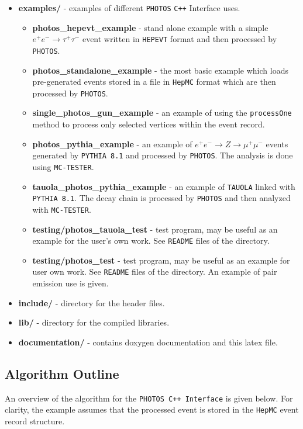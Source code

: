 \documentclass[]{Photos_interface_design}
\begin{document}
\begin{itemize}
  \item {\bf examples/ } - examples of different {\tt PHOTOS} {\tt C++} Interface uses.
    \begin{itemize}
        \item {\bf photos\_hepevt\_example} - stand alone example with a simple 
        $e^+e^- \rightarrow \tau^+\tau^-$ event written in {\tt HEPEVT} format
         and then processed by {\tt PHOTOS}.
	\item {\bf photos\_standalone\_example} - the most basic example which loads pre-generated 
	      events stored in a file in {\tt HepMC} format which are then processed by {\tt PHOTOS}.
	\item {\bf single\_photos\_gun\_example} - an example of using the {\tt processOne} method
	      to process only selected vertices within the event record.
    \item {\bf photos\_pythia\_example} - an example of $e^+e^- \rightarrow Z \rightarrow \mu^+\mu^-$ events
	generated by {\tt PYTHIA 8.1} and processed by {\tt PHOTOS}. The analysis is done using {\tt MC-TESTER}.
    \item {\bf tauola\_photos\_pythia\_example } - an example of  {\tt TAUOLA} linked with {\tt PYTHIA 8.1}.
	The decay chain is processed by {\tt PHOTOS} and then analyzed with {\tt MC-TESTER}.
\item {\bf testing/photos\_tauola\_test} - test program, may be useful as an example for the user's own work. See {\tt README} files of the directory. 
\item {\bf testing/photos\_test} - test program, may be useful as an example for user own work. See {\tt README} files of the directory. An example of pair emission use is given.
    \end{itemize}   
  \item {\bf include/} - directory for the header files.
  \item {\bf lib/ } - directory for the compiled  libraries. 
  \item {\bf documentation/ } - contains doxygen documentation and this latex file.
\end{itemize}

\subsection{Algorithm Outline}
\label{sect:Outline}

An overview of the algorithm for  the {\tt PHOTOS C++ Interface} is
given below. For clarity, the example assumes that the processed event
is stored in the {\tt HepMC} event record structure.
\end{document}
